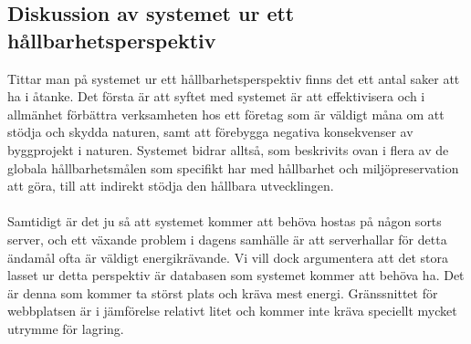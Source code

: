 \subsection{Diskussion av systemet ur ett hållbarhetsperspektiv}

Tittar man på systemet ur ett hållbarhetsperspektiv finns det ett antal saker att ha i åtanke. Det första är att syftet med systemet är att effektivisera och i allmänhet förbättra verksamheten hos ett företag som är väldigt måna om att stödja och skydda naturen, samt att förebygga negativa konsekvenser av byggprojekt i naturen. Systemet bidrar alltså, som beskrivits ovan i flera av de globala hållbarhetsmålen som specifikt har med hållbarhet och miljöpreservation att göra, till att indirekt stödja den hållbara utvecklingen.
\\
\\
Samtidigt är det ju så att systemet kommer att behöva hostas på någon sorts server, och ett växande problem i dagens samhälle är att serverhallar för detta ändamål ofta är väldigt energikrävande. Vi vill dock argumentera att det stora lasset ur detta perspektiv är databasen som systemet kommer att behöva ha. Det är denna som kommer ta störst plats och kräva mest energi. Gränssnittet för webbplatsen är i jämförelse relativt litet och kommer inte kräva speciellt mycket utrymme för lagring. 